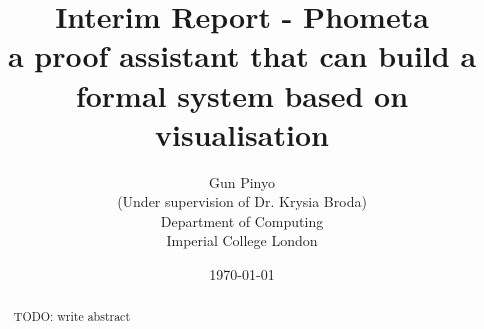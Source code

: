 \documentclass[11pt, a4paper]{report}
\title{
    Interim Report - Phometa \\
    a proof assistant that can build a formal system based on visualisation
}
\author{
    Gun Pinyo \\
    (Under supervision of Dr. Krysia Broda) \\
    Department of Computing \\
    Imperial College London
}
\date{\today}
\begin{document}
\maketitle
\thispagestyle{empty}

\begin{abstract}
TODO: write abstract
\end{abstract}

\tableofcontents






\end{document}
